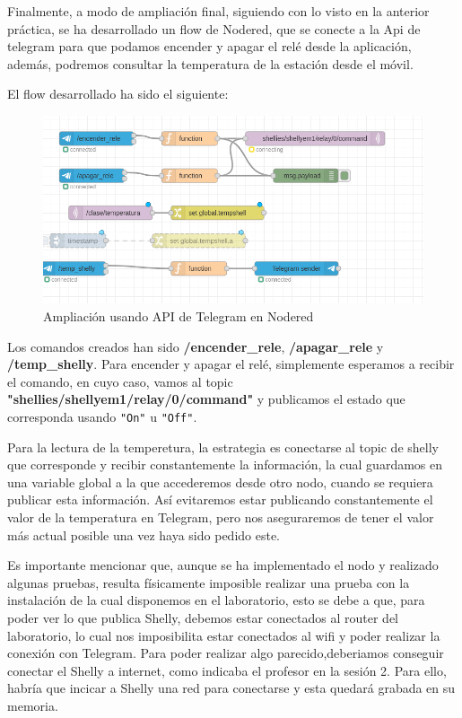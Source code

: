 \documentclass[12pt, a4paper]{article}
\begin{document}
Finalmente, a modo de ampliación final, siguiendo con lo visto en la anterior práctica, se ha desarrollado un flow de 
Nodered, que se conecte a la Api de telegram para que podamos encender y apagar el relé desde la aplicación, además, podremos consultar la temperatura
de la estación desde el móvil. 

El flow desarrollado ha sido el siguiente:

\begin{figure}[H]
    \centering
    \includegraphics[scale=0.5]{ampliaciontelegram.png}
    \caption{Ampliación usando API de Telegram en Nodered}
\end{figure}

Los comandos creados han sido \textbf{/encender\_rele}, \textbf{/apagar\_rele}
 y \textbf{/temp\_shelly}. Para encender y apagar el relé, simplemente esperamos a recibir el comando, en cuyo caso,
vamos al topic \textbf{"shellies/shellyem1/relay/0/command"} y publicamos el estado que corresponda usando 
\verb|"On"| u \verb|"Off"|.

Para la lectura de la temperetura, la estrategia es conectarse al topic de shelly que corresponde y recibir constantemente 
la información, la cual guardamos en una variable global a la que accederemos desde otro nodo, cuando se  requiera publicar esta información.
Así evitaremos estar publicando constantemente el valor de la temperatura en Telegram, pero nos aseguraremos de tener el valor más actual posible 
una vez haya sido pedido este.

Es importante mencionar que, aunque se ha implementado el nodo y realizado algunas pruebas, resulta físicamente imposible realizar una prueba con 
la instalación de la cual disponemos en el laboratorio, esto se debe a que, para poder ver lo que publica Shelly, debemos estar conectados al router del laboratorio,
lo cual nos imposibilita estar conectados al wifi y poder realizar la conexión con Telegram. Para poder realizar algo parecido,deberiamos conseguir conectar el Shelly a internet, como indicaba
el profesor en la sesión 2. Para ello, habría que incicar a Shelly una red para conectarse y esta quedará grabada en su memoria.
\end{document}
